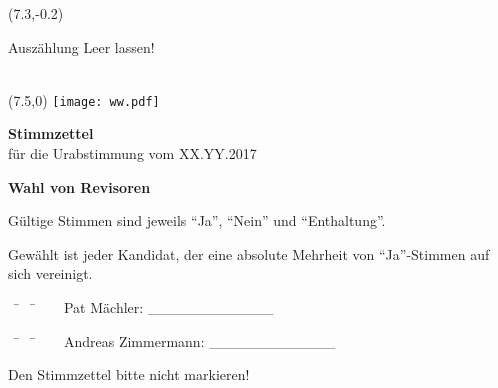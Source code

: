 \documentclass[11pt, a4paper]{scrartcl}
\begin{document}
{\begin{minipage}[t][12.5cm][t]{\textwidth}
\begin{textblock}{6}(7.3,-0.2)
\begin{framed}
Auszählung \hfill Leer lassen! \\
\vspace{1.5cm} ~ \\
\end{framed}
\end{textblock}


\end{minipage}

\newpage

\begin{minipage}[t][12.5cm][t]{\textwidth}

\begin{textblock}{6}(7.5,0)
\texttt{[image: ww.pdf]}
\end{textblock}

{\LARGE\textbf{Stimmzettel}} \\
für die Urabstimmung vom XX.YY.2017 \\

\vspace{2cm}


\textbf{Wahl von Revisoren}

Gültige Stimmen sind jeweils \enquote{Ja}, \enquote{Nein} und \enquote{Enthaltung}.

Gewählt ist jeder Kandidat, der eine absolute Mehrheit von \enquote{Ja}-Stimmen auf sich vereinigt.

\vspace{1cm}
\begin{tabbing}
~\hspace{2cm} \= ~\hspace{8cm} \= ~\hspace{2cm} \kill
~\> Pat Mächler:        \> \_\_\_\_\_\_\_\_\_\_\_\_ \\
\end{tabbing}

\vspace{0.1cm}
\begin{tabbing}
~\hspace{2cm} \= ~\hspace{8cm} \= ~\hspace{2cm} \kill
~\> Andreas Zimmermann: \> \_\_\_\_\_\_\_\_\_\_\_\_ \\
\end{tabbing}

\vspace{0.5cm}
Den Stimmzettel bitte nicht markieren!

\end{minipage}


}
\end{document}
